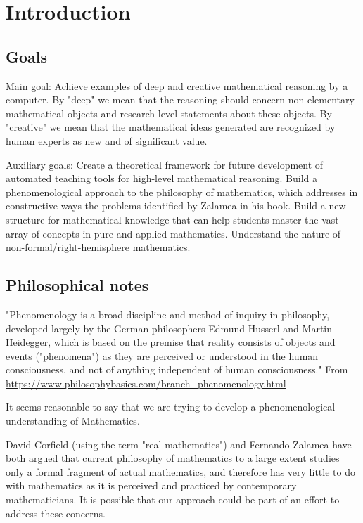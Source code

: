 
\section{Introduction}



\subsection{Goals}

Main goal: Achieve examples of deep and creative mathematical reasoning by a computer. By "deep" we mean that the reasoning should concern non-elementary mathematical objects and research-level statements about these objects. By "creative" we mean that the mathematical ideas generated are recognized by human experts as new and of significant value.

Auxiliary goals: Create a theoretical framework for future development of automated teaching tools for high-level mathematical reasoning. Build a phenomenological approach to the philosophy of mathematics, which addresses in constructive ways the problems identified by Zalamea in his book. Build a new structure for mathematical knowledge that can help students master the vast array of concepts in pure and applied mathematics. Understand the nature of non-formal/right-hemisphere mathematics.


\subsection{Philosophical notes}

"Phenomenology is a broad discipline and method of inquiry in philosophy, developed largely by the German philosophers Edmund Husserl and Martin Heidegger, which is based on the premise that reality consists of objects and events ("phenomena") as they are perceived or understood in the human consciousness, and not of anything independent of human consciousness."
From \url{https://www.philosophybasics.com/branch_phenomenology.html}

It seems reasonable to say that we are trying to develop a phenomenological understanding of Mathematics.

David Corfield (using the term "real mathematics") and Fernando Zalamea have both argued that current philosophy of mathematics to a large extent studies only a formal fragment of actual mathematics, and therefore has very little to do with mathematics as it is perceived and practiced by contemporary mathematicians. It is possible that our approach could be part of an effort to address these concerns.

